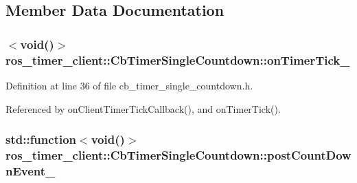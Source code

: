 \subsection{Member Data Documentation}
\subsubsection[{\texorpdfstring{on\+Timer\+Tick\+\_\+}{onTimerTick_}}]{$<$void()$>$ ros\+\_\+timer\+\_\+client\+::\+Cb\+Timer\+Single\+Countdown\+::on\+Timer\+Tick\+\_\+\hspace{0.3cm}{\ttfamily [private]}}\hypertarget{classros__timer__client_1_1CbTimerSingleCountdown_afe2cb62b4a24108c637cb955a0957bd1}{}\label{classros__timer__client_1_1CbTimerSingleCountdown_afe2cb62b4a24108c637cb955a0957bd1}


Definition at line 36 of file cb\+\_\+timer\+\_\+single\+\_\+countdown.\+h.



Referenced by on\+Client\+Timer\+Tick\+Callback(), and on\+Timer\+Tick().

\subsubsection[{\texorpdfstring{post\+Count\+Down\+Event\+\_\+}{postCountDownEvent_}}]{\setlength{\rightskip}{0pt plus 5cm}std\+::function$<$void()$>$ ros\+\_\+timer\+\_\+client\+::\+Cb\+Timer\+Single\+Countdown\+::post\+Count\+Down\+Event\+\_\+\hspace{0.3cm}{\ttfamily [private]}}\hypertarget{classros__timer__client_1_1CbTimerSingleCountdown_a41f6a4f04199527ddfc551345d2367d0}{}\label{classros__timer__client_1_1CbTimerSingleCountdown_a41f6a4f04199527ddfc551345d2367d0}


